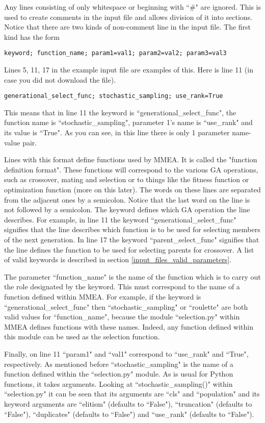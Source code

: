 \documentclass{article}
\begin{document}
Any lines consisting of only whitespace or beginning with ``\#" are ignored. This is used to create comments in the input file and allows division of it into sections. Notice that there are two kinds of non-comment line in the input file. The first kind has the form
\begin{verbatim}
keyword; function_name; param1=val1; param2=val2; param3=val3
\end{verbatim}
Lines 5, 11, 17 in the example input file are examples of this. Here is line 11 (in case you did not download the file).
\begin{verbatim}
generational_select_func; stochastic_sampling; use_rank=True
\end{verbatim}
This means that in line 11 the keyword is ``generational\_select\_func", the function name is ``stochastic\_sampling", parameter 1's name is ``use\_rank" and its value is ``True". As you can see, in this line there is only 1 parameter name-value pair.

Lines with this format define functions used by MMEA. It is called the "function definition format". These functions will correspond to the various GA operations, such as crossover, mating and selection or to things like the fitness function or optimization function (more on this later). The words on these lines are separated from the adjacent ones by a semicolon. Notice that the last word on the line is not followed by a semicolon. The keyword defines which GA operation the line describes. For example, in line 11 the keyword ``generational\_select\_func" signifies that the line describes which function is to be used for selecting members of the next generation. In line 17 the keyword ``parent\_select\_func" signifies that the line defines the function to be used for selecting parents for crossover. A list of valid keywords is described in section \ref{input_files_valid_parameters}.

The parameter ``function\_name" is the name of the function which is to carry out the role designated by the keyword. This must correspond to the name of a function defined within MMEA. For example, if the keyword is ``generational\_select\_func" then ``stochastic\_sampling" or ``roulette" are both valid values for ``function\_name", because the module ``selection.py" within MMEA defines functions with these names. Indeed, any function defined within this module can be used as the selection function.

Finally, on line 11 ``param1" and ``val1" correspond to ``use\_rank" and ``True", respectively. As mentioned before ``stochastic\_sampling" is the name of a function defined within the ``selection.py" module. As is usual for Python functions, it takes arguments. Looking at ``stochastic\_sampling()" within ``selection.py" it can be seen that its arguments are ``cls" and ``population" and its keyword arguments are ``elitism" (defaults to ``False"), ``truncation" (defaults to ``False"), ``duplicates" (defaults to ``False") and ``use\_rank" (defaults to ``False").
\end{document}
